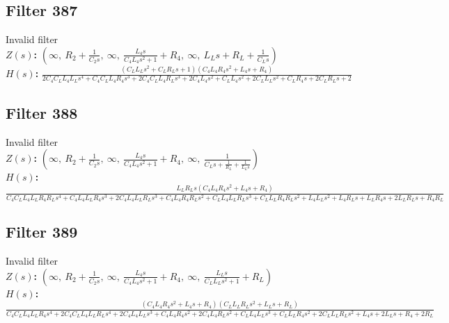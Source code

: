 \documentclass{article}
\begin{document}
\subsection*{Filter 387}
Invalid filter \\ 
\textbf{$Z(s)$:} $\left( \infty, \  R_{2} + \frac{1}{C_{2} s}, \  \infty, \  \frac{L_{4} s}{C_{4} L_{4} s^{2} + 1} + R_{4}, \  \infty, \  L_{L} s + R_{L} + \frac{1}{C_{L} s}\right)$ \\ 
\textbf{$H(s)$:} $\frac{\left(C_{L} L_{L} s^{2} + C_{L} R_{L} s + 1\right) \left(C_{4} L_{4} R_{4} s^{2} + L_{4} s + R_{4}\right)}{2 C_{4} C_{L} L_{4} L_{L} s^{4} + C_{4} C_{L} L_{4} R_{4} s^{3} + 2 C_{4} C_{L} L_{4} R_{L} s^{3} + 2 C_{4} L_{4} s^{2} + C_{L} L_{4} s^{2} + 2 C_{L} L_{L} s^{2} + C_{L} R_{4} s + 2 C_{L} R_{L} s + 2}$ \\ 
\subsection*{Filter 388}
Invalid filter \\ 
\textbf{$Z(s)$:} $\left( \infty, \  R_{2} + \frac{1}{C_{2} s}, \  \infty, \  \frac{L_{4} s}{C_{4} L_{4} s^{2} + 1} + R_{4}, \  \infty, \  \frac{1}{C_{L} s + \frac{1}{R_{L}} + \frac{1}{L_{L} s}}\right)$ \\ 
\textbf{$H(s)$:} $\frac{L_{L} R_{L} s \left(C_{4} L_{4} R_{4} s^{2} + L_{4} s + R_{4}\right)}{C_{4} C_{L} L_{4} L_{L} R_{4} R_{L} s^{4} + C_{4} L_{4} L_{L} R_{4} s^{3} + 2 C_{4} L_{4} L_{L} R_{L} s^{3} + C_{4} L_{4} R_{4} R_{L} s^{2} + C_{L} L_{4} L_{L} R_{L} s^{3} + C_{L} L_{L} R_{4} R_{L} s^{2} + L_{4} L_{L} s^{2} + L_{4} R_{L} s + L_{L} R_{4} s + 2 L_{L} R_{L} s + R_{4} R_{L}}$ \\ 
\subsection*{Filter 389}
Invalid filter \\ 
\textbf{$Z(s)$:} $\left( \infty, \  R_{2} + \frac{1}{C_{2} s}, \  \infty, \  \frac{L_{4} s}{C_{4} L_{4} s^{2} + 1} + R_{4}, \  \infty, \  \frac{L_{L} s}{C_{L} L_{L} s^{2} + 1} + R_{L}\right)$ \\ 
\textbf{$H(s)$:} $\frac{\left(C_{4} L_{4} R_{4} s^{2} + L_{4} s + R_{4}\right) \left(C_{L} L_{L} R_{L} s^{2} + L_{L} s + R_{L}\right)}{C_{4} C_{L} L_{4} L_{L} R_{4} s^{4} + 2 C_{4} C_{L} L_{4} L_{L} R_{L} s^{4} + 2 C_{4} L_{4} L_{L} s^{3} + C_{4} L_{4} R_{4} s^{2} + 2 C_{4} L_{4} R_{L} s^{2} + C_{L} L_{4} L_{L} s^{3} + C_{L} L_{L} R_{4} s^{2} + 2 C_{L} L_{L} R_{L} s^{2} + L_{4} s + 2 L_{L} s + R_{4} + 2 R_{L}}$ \\ 
\end{document}

